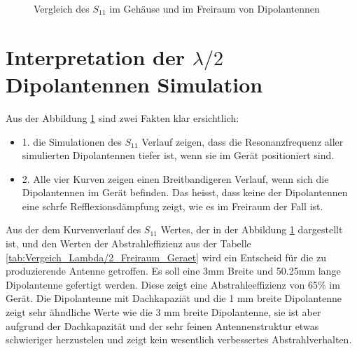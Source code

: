 \begin{figure}[!ht]
	\centering
	\begingroup
	
	\endgroup
	\caption{Vergleich des $S_{11}$ im Gehäuse und im Freiraum von Dipolantennen }	
	\label{S11_Vergleich_Simulation_Dipolantenn_freiraum_Geraet}
\end{figure}


\newpage
\section{Interpretation der $\lambda/2$ Dipolantennen Simulation}\label{sec:Interpretation_Dipol}

Aus der Abbildung \ref{S11_Vergleich_Simulation_Dipolantenn_freiraum_Geraet} sind zwei Fakten klar ersichtlich: \\
\begin{itemize}
\item 1. die Simulationen des $S_{11}$ Verlauf zeigen, dass die Resonanzfrequenz aller simulierten Dipolantennen tiefer ist, wenn sie im Gerät positioniert sind.
\item 2. Alle vier Kurven zeigen einen Breitbandigeren Verlauf, wenn sich die Dipolantennen im Gerät befinden. Das heisst, dass keine der Dipolantennen  eine schrfe Refflexionsdämpfung zeigt, wie es im Freiraum der Fall ist. 
\end{itemize}

Aus der dem Kurvenverlauf des $S_{11}$ Wertes, der in der Abbildung \ref{S11_Vergleich_Simulation_Dipolantenn_freiraum_Geraet} dargestellt ist, und den Werten der Abstrahleffizienz aus der Tabelle \ref{tab:Vergeich_Lambda/2_Freiraum_Geraet} wird ein Entscheid für die zu produzierende Antenne getroffen. Es soll eine 3mm Breite und 50.25mm lange Dipolantenne gefertigt werden. Diese zeigt eine Abstrahleeffizienz von 65$\%$ im Gerät. Die Dipolantenne mit Dachkapaziät und die 1 mm breite Dipolantenne zeigt sehr ähndliche Werte wie die 3 mm breite Dipolantenne, sie ist aber aufgrund der Dachkapazität und der sehr feinen Antennenstruktur etwas schwieriger herzustelen und zeigt kein wesentlich verbessertes Abstrahlverhalten.

